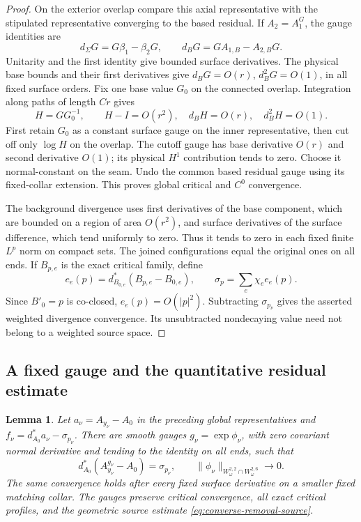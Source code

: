 \documentclass[11pt]{amsart}
\newtheorem{lemma}[theorem]{Lemma}
\theoremstyle{definition}
\theoremstyle{remark}
\theoremstyle{plain}
\begin{document}
\begin{proof}
On the exterior overlap compare this axial representative with
the stipulated representative converging to the based residual.
If $A_2=A_1^G$, the gauge identities are
\[
 d_\Sigma G=G\beta_1-\beta_2G,\qquad
 d_BG=GA_{1,B}-A_{2,B}G.
\]
Unitarity and the first identity give bounded surface derivatives.
The physical base bounds and their first derivatives give
$d_BG=O(r)$, $d_B^2G=O(1)$, in all fixed surface orders.
Fix one base value $G_0$ on the connected overlap. Integration
along paths of length $Cr$ gives
\[
 H=GG_0^{-1},\qquad H-I=O(r^2),\quad d_BH=O(r),\quad
                                      d_B^2H=O(1).
\]
First retain $G_0$ as a constant surface gauge on the inner
representative, then cut off only $\log H$ on the overlap.
The cutoff gauge has base derivative $O(r)$ and second
derivative $O(1)$; its physical $H^1$ contribution tends to
zero. Choose it normal-constant on the seam. Undo the common
based residual gauge using its fixed-collar extension.
This proves global critical and $C^0$ convergence.

The background divergence uses first derivatives of the base
component, which are bounded on a region of area $O(r^2)$,
and surface derivatives of the surface difference, which tend
uniformly to zero. Thus it tends to zero in each fixed finite
$L^p$ norm on compact sets. The joined configurations equal
the original ones on all ends. If $B_{p,e}$ is the exact
critical family, define
\begin{equation}\label{eq:converse-end-divergence}
 e_e(p)=d_{B_{0,e}}^*(B_{p,e}-B_{0,e}),\qquad
 \sigma_p=\sum_e\chi_e e_e(p).
\end{equation}
Since $B'_0=p$ is co-closed, $e_e(p)=O(|p|^2)$.
Subtracting $\sigma_{p_\nu}$ gives the asserted weighted
divergence convergence. Its unsubtracted nondecaying value
need not belong to a weighted source space.
\end{proof}

\subsection{A fixed gauge and the quantitative residual estimate}

\begin{lemma}\label{lem:converse-fixed-gauge}
Let $a_\nu=A_{y_\nu}-A_0$ in the preceding global representatives
and $f_\nu=d_{A_0}^*a_\nu-\sigma_{p_\nu}$. There are smooth
gauges $g_\nu=\exp\phi_\nu$, with zero covariant normal derivative
and tending to the identity on all ends, such that
\[
 d_{A_0}^*(A_{y_\nu}^{g_\nu}-A_0)=\sigma_{p_\nu},\qquad
 \|\phi_\nu\|_{W_\omega^{2,2}\cap W_\omega^{2,6}}\to0.
\]
The same convergence holds after every fixed surface derivative
on a smaller fixed matching collar. The gauges preserve critical
convergence, all exact critical profiles, and the geometric
source estimate \eqref{eq:converse-removal-source}.
\end{lemma}
\end{document}
